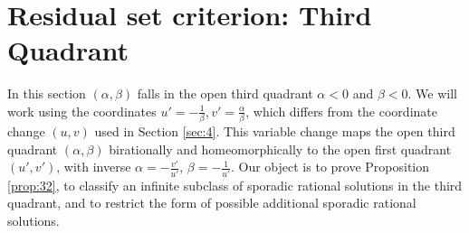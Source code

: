 \documentclass[12pt,letterpaper, reqno]{amsart}
\theoremstyle{definition}
\theoremstyle{remark}
\renewcommand{\AA}{\mathbb{A}}
\newcommand{\PP}{\mathbb{P}}
\newcommand{\uu}{{u'}}
\newcommand{\vv}{{v'}}
\begin{document}
 
%
%

\section{Residual set criterion: Third Quadrant} \label{sec:5}
\setcounter{equation}{0}


In this section $(\alpha, \beta)$  falls  in the open third quadrant $\alpha<0$ and  $\beta <0$.
We  will work using  the coordinates  
$\uu= -\frac{1}{\beta}, \vv = \frac{\alpha}{\beta}$, which differs from the coordinate change
$(u, v)$ used in Section \ref{sec:4}. This variable change maps the open
third quadrant $(\alpha, \beta)$ birationally and homeomorphically to the open first quadrant $(\uu,\vv)$, 
with inverse $\alpha= -\frac{\vv}{\uu},\, \beta= -\frac{1}{\uu}.$
Our object is to prove  Proposition \ref{prop:32},  to classify an infinite subclass of 
sporadic rational solutions in the third quadrant, and to restrict the form of possible
additional sporadic rational solutions.
\end{document}
